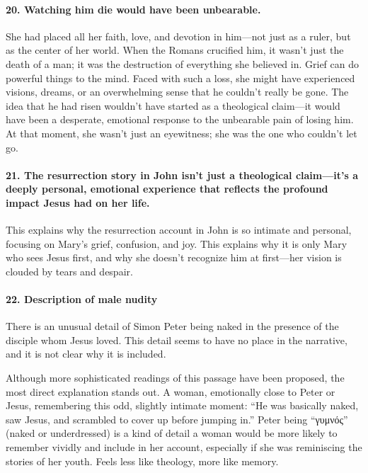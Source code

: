 \paragraph{20.
Watching him die would have been unbearable.}\label{par:watching-him-die-would-have-been-unbearable.}

She had placed all her faith, love, and devotion in him---not just as a ruler, but as the center of her world.
When the Romans crucified him, it wasn't just the death of a man; it was the destruction of everything she believed in.
Grief can do powerful things to the mind.
Faced with such a loss, she might have experienced visions, dreams, or an overwhelming sense that he couldn't really be gone.
The idea that he had risen wouldn't have started as a theological claim---it would have been a desperate, emotional response to the unbearable pain of losing him.
At that moment, she wasn't just an eyewitness; she was the one who couldn't let go.

\paragraph{21.
The resurrection story in John isn't just a theological claim---it's a deeply personal, emotional experience that reflects the profound impact Jesus had on her life.}\label{par:the-resurrection-story-in-john-isnt-just-a-theological-claimits-a-deeply-personal-emotional-experience-that-reflects-the-profound-impact-jesus-had-on-her-life.}

This explains why the resurrection account in John is so intimate and personal, focusing on Mary's grief, confusion, and joy.
This explains why it is only Mary who sees Jesus first, and why she doesn't recognize him at first---her vision is clouded by tears and despair.

\paragraph{22.
Description of male nudity}\label{par:description-of-male-nudity}

There is an unusual detail of Simon Peter being naked in the presence of the disciple whom Jesus loved.
This detail seems to have no place in the narrative, and it is not clear why it is included.

Although more sophisticated readings of this passage have been proposed, the most direct explanation stands out.
A woman, emotionally close to Peter or Jesus, remembering this odd, slightly intimate moment: ``He was basically naked, saw Jesus, and scrambled to cover up before jumping in.'' Peter being ``γυμνός'' (naked or underdressed) is a kind of detail a woman would be more likely to remember vividly and include in her account, especially if she was reminiscing the stories of her youth.
Feels less like theology, more like memory.

